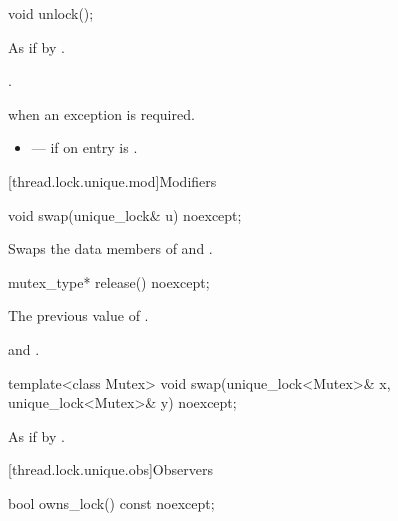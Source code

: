 %
\begin{itemdecl}
void unlock();
\end{itemdecl}

\begin{itemdescr}
\pnum\effects As if by .

\pnum\ensures {}.

\pnum\throws {} when
an exception is required.

\pnum \errors
\begin{itemize}
\item {} --- if on entry  is .
\end{itemize}
\end{itemdescr}

[thread.lock.unique.mod]{Modifiers}

%
\begin{itemdecl}
void swap(unique_lock& u) noexcept;
\end{itemdecl}

\begin{itemdescr}
\pnum\effects Swaps the data members of  and .
\end{itemdescr}

%
\begin{itemdecl}
mutex_type* release() noexcept;
\end{itemdecl}

\begin{itemdescr}
\pnum\returns The previous value of .

\pnum\ensures {} and .
\end{itemdescr}

%
\begin{itemdecl}
template<class Mutex>
  void swap(unique_lock<Mutex>& x, unique_lock<Mutex>& y) noexcept;
\end{itemdecl}

\begin{itemdescr}
\pnum\effects As if by .
\end{itemdescr}

[thread.lock.unique.obs]{Observers}

%
\begin{itemdecl}
bool owns_lock() const noexcept;
\end{itemdecl}

